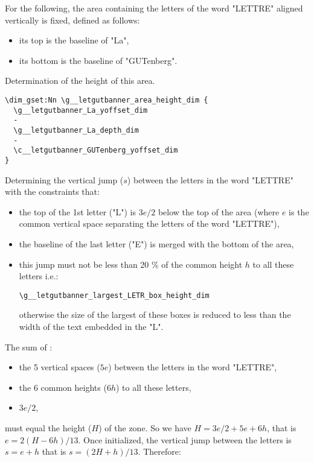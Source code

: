 \documentclass{letgut}
\begin{document}
For the following, the area containing the letters of the word "LETTRE" aligned
vertically is fixed, defined as follows:
\begin{itemize}
\item its top is the baseline of "La",
\item its bottom is the baseline of "GUTenberg".
\end{itemize}
Determination of the height of this area.
\begin{lstlisting}
\dim_gset:Nn \g__letgutbanner_area_height_dim {
  \g__letgutbanner_La_yoffset_dim
  -
  \g__letgutbanner_La_depth_dim
  -
  \c__letgutbanner_GUTenberg_yoffset_dim
}
\end{lstlisting}
Determining the vertical jump (\(s\)) between the letters in the word "LETTRE"
with the constraints that:
\begin{itemize}
\item the top of the 1st letter ("L") is \(3e/2\) below the top of the area (where
\(e\) is the common vertical space separating the letters of the word
"LETTRE"),
\item the baseline of the last letter ("E") is merged with the bottom of the area,
\item this jump must not be less than 20 \% of the common height \(h\) to all these
letters i.e.:

\lstinline+\g__letgutbanner_largest_LETR_box_height_dim+

otherwise the size of the largest of these boxes is reduced to less than the
width of the text embedded in the "L".
\end{itemize}

The sum of :
\begin{itemize}
\item the 5 vertical spaces (\(5e\)) between the letters in the word "LETTRE",
\item the 6 common heights (\(6h\)) to all these letters,
\item \(3e/2\),
\end{itemize}
must equal the height (\(H\)) of the zone. So we have \(H=3e/2+5e+6h\), that is
\(e=2(H-6h)/13\). Once initialized, the vertical jump between the letters is
\(s=e+h\) that is \(s=(2H+h)/13\). Therefore:
\end{document}
